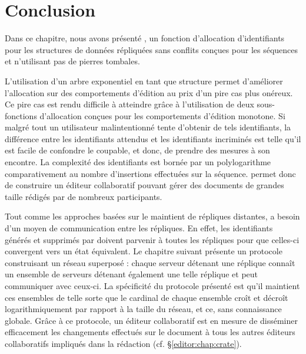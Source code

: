 
\section{Conclusion}
\label{repl:sec:conclusion}

Dans ce chapitre, nous avons présenté \LSEQ, un fonction d'allocation
d'identifiants pour les structures de données répliquées sans conflits conçues
pour les séquences et n'utilisant pas de pierres tombales.

L'utilisation d'un arbre exponentiel en tant que structure permet d'améliorer
l'allocation sur des comportements d'édition au prix d'un pire cas plus
onéreux. Ce pire cas est rendu difficile à atteindre grâce à l'utilisation de
deux sous-fonctions d'allocation conçues pour les comportements d'édition
monotone. Si malgré tout un utilisateur malintentionné tente d'obtenir de tels
identifiants, la différence entre les identifiants attendus et les identifiants
incriminés est telle qu'il est facile de confondre le coupable, et donc, de
prendre des mesures à son encontre. La complexité des identifiants \LSEQ est
bornée par un polylogarithme comparativement au nombre d'insertions effectuées
sur la séquence. \LSEQ permet donc de construire un éditeur collaboratif pouvant
gérer des documents de grandes taille rédigés par de nombreux participants.

Tout comme les approches basées sur le maintient de répliques distantes, \LSEQ a
besoin d'un moyen de communication entre les répliques. En effet, les
identifiants générés et supprimés par \LSEQ doivent parvenir à toutes les
répliques pour que celles-ci convergent vers un état équivalent.  Le chapitre
suivant présente un protocole construisant un réseau superposé : chaque serveur
détenant une réplique connaît un ensemble de serveurs détenant également une
telle réplique et peut communiquer avec ceux-ci. La spécificité du protocole
présenté est qu'il maintient ces ensembles de telle sorte que le cardinal de
chaque ensemble croît et décroît logarithmiquement par rapport à la taille du
réseau, et ce, sans connaissance globale. Grâce à ce protocole, un éditeur
collaboratif est en mesure de disséminer efficacement les changements effectués
sur le document à tous les autres éditeurs collaboratifs impliqués dans la
rédaction (cf. §\ref{editor:chap:crate}).


